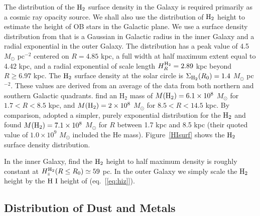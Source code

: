 \documentclass[12pt,preprint,flushrt]{aastex}
\begin{document}
The distribution of the ${\rm H_2}$ surface density
in the Galaxy is required primarily as a cosmic ray opacity source.
We shall also use the distribution of ${\rm H_2}$ height to
estimate the height of OB stars in the Galactic plane.
We use a surface density distribution from \cite{bron00}
that is a Gaussian in
Galactic radius in the inner Galaxy and a radial exponential in the
outer Galaxy. The distribution has a peak value of 4.5 $M_\odot$ pc$^{-2}$
centered on $R=4.85$ kpc, a full width at half maximum extent
equal to 4.42 kpc, and a radial exponential of scale length
$H_R^{\rm H_2}=2.89$ kpc beyond
$R \ge 6.97$ kpc. The ${\rm H_2}$ surface density at the solar circle is
$\Sigma_{\rm H_2}(R_0 ) = 1.4$  $M_\odot$ pc$^{-2}$. These values
are derived from an average of the data from both
northern and southern Galactic quadrants. \cite{bron00} find
an H$_2$ mass of $M({\rm H_2})=6.1\times 10^8$ $M_\odot$ for
$1.7 < R < 8.5$ kpc,
and $M({\rm H_2})=2\times 10^8$ $M_\odot$ for $8.5 < R < 14.5$ kpc.
By comparison,
\cite{wil97} adopted a simpler, purely exponential distribution for the
${\rm H}_2$ and found $M({\rm H_2}) = 7.1\times 10^8$ $M_\odot$ for
$R$ between 1.7 kpc and 8.5 kpc (their quoted value of
$1.0\times 10^9$ $M_\odot$
included the He mass).
Figure~\ref{HIsurf} shows the ${\rm H_2}$ surface density
distribution.

In the inner Galaxy, \cite{bron00} find the ${\rm H_2}$ height to
half maximum density is roughly constant
at $H^{\rm H_2}_z(R \le R_0) \simeq 59$ pc. In the outer Galaxy we
simply scale the ${\rm H_2}$ height by the ${\rm H~I}$ height of \cite{wou90}
(eq.\ [\ref{eq:hiz}]).


\subsection{Distribution of Dust and Metals}
\label{sub:Metallicity}
\end{document}
